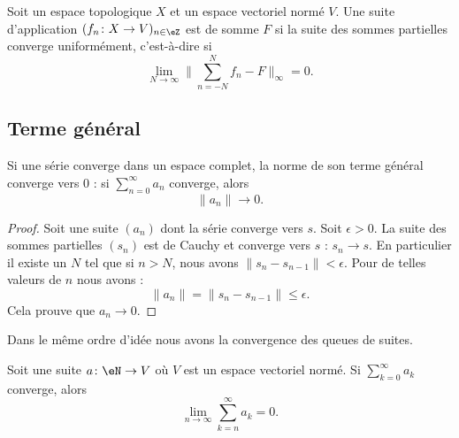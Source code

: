 \begin{definition}        \label{DEFooPABSooPMXMOV}
	Soit un espace topologique \( X\) et un espace vectoriel normé \( V\). Une suite d'application \( (f_n \colon X\to V)_{n\in \eZ}  \) est  de somme \( F\) si la suite des sommes partielles converge uniformément, c'est-à-dire si
	\begin{equation}        \label{EqLNCJooVCTiIw}
		\lim_{N\to \infty} \| \sum_{n=-N}^Nf_n-F \|_{\infty}=0.
	\end{equation}
\end{definition}

\subsection{Terme général}

\begin{proposition}  \label{PROPooYDFUooTGnYQg}
	Si une série converge dans un espace complet, la norme de son terme général converge vers \( 0\) : si \( \sum_{n=0}^{\infty}a_n\) converge, alors
	\begin{equation}
		\| a_n \|\to 0.
	\end{equation}
\end{proposition}

\begin{proof}
	Soit une suite \( (a_n)\) dont la série converge vers \( s\). Soit \( \epsilon>0\). La suite des sommes partielles \( (s_n)\) est de Cauchy et converge vers \( s\) : \( s_n\to s\). En particulier il existe un \( N\) tel que si \( n>N\), nous avons \( \| s_n-s_{n-1} \|<\epsilon\). Pour de telles valeurs de \( n\) nous avons :
	\begin{equation}
		\| a_n \|=\| s_n-s_{n-1} \|\leq \epsilon.
	\end{equation}
	Cela prouve que \( a_n\to 0\).
\end{proof}

Dans le même ordre d'idée nous avons la convergence des queues de suites.

\begin{lemma}       \label{LEMooFUCOooCOqLRj}
	Soit une suite \( a\colon \eN\to V\) où \( V\) est un espace vectoriel normé. Si \( \sum_{k=0}^{\infty}a_k\) converge, alors
	\begin{equation}
		\lim_{n\to \infty} \sum_{k=n}^{\infty}a_k=0.
	\end{equation}
\end{lemma}

